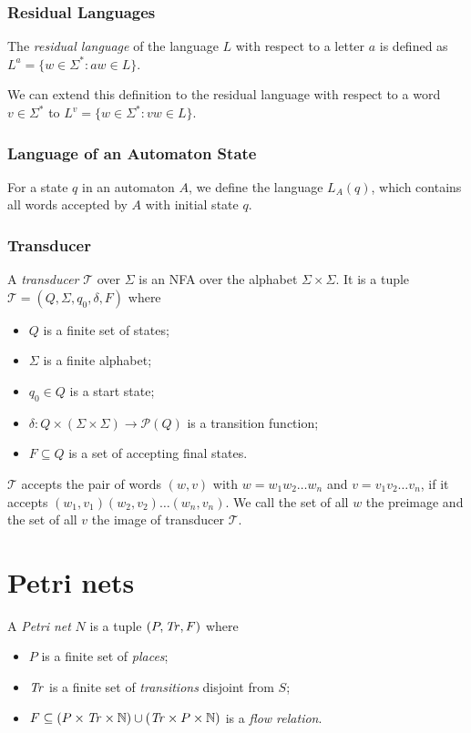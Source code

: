 \subsubsection{Residual Languages}

The \emph{residual language} of the language $L$ with respect to a letter $a$ is defined as \break
$L^{a} = \{ w \in \Sigma^{*} : aw \in L \}$.

We can extend this definition to the residual language with respect to a word $v \in \Sigma^{*}$ to \break
$L^{v} = \{ w \in \Sigma^{*} : vw \in L \}$.

\subsubsection{Language of an Automaton State}

For a state $q$ in an automaton $A$, we define the language $L_{A}(q)$, which contains all words accepted by $A$ with initial state $q$.

\subsubsection{Transducer}

A \emph{transducer} $\mathcal{T}$ over $\Sigma$ is an NFA over the alphabet $\Sigma \times \Sigma$. 
It is a tuple $\mathcal{T} = (Q,\Sigma,q_{0},\delta,F)$ where 
\begin{itemize}[-,noitemsep]
\item $Q$ is a finite set of states;
\item $\Sigma$ is a finite alphabet;
\item $q_{0} \in Q$ is a start state;
\item $\delta : Q \times (\Sigma \times \Sigma) \rightarrow \mathcal{P}(Q)$ is a transition function;
\item $F \subseteq Q$ is a set of accepting final states.
\end{itemize}
$\mathcal{T}$ accepts the pair of words $(w,v)$ with $w = w_{1}w_{2} \ldots w_{n}$ and $v=v_{1}v_{2} \ldots v_{n}$, if it accepts $(w_{1},v_{1})(w_{2},v_{2}) \ldots (w_{n},v_{n})$.
We call the set of all $w$ the preimage and the set of all $v$ the image of transducer $\mathcal{T}$.


\section{Petri nets}

A \emph{Petri net} $N$ is a tuple $(P,\mathit{Tr},F)$ where 
\begin{itemize}[-,noitemsep]
	\item $P$ is a finite set of \emph{places};
	\item $\mathit{Tr}$ is a finite set of \emph{transitions} disjoint from $S$;
	\item $F \subseteq (P \times \mathit{Tr} \times \mathbb{N}) \cup (\mathit{Tr} \times P \times \mathbb{N})$ is a \emph{flow relation}.
\end{itemize}

